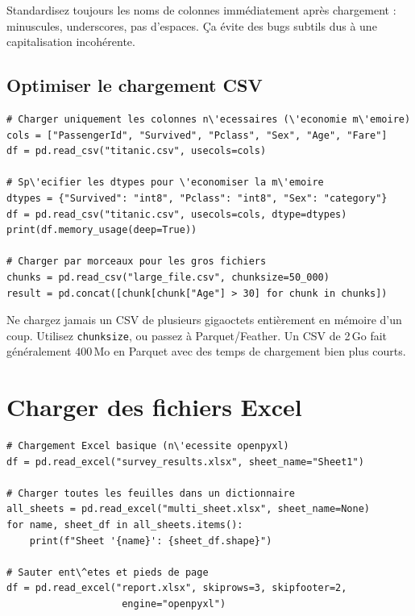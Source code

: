 \begin{preprocesstip}
Standardisez toujours les noms de colonnes imm\'ediatement apr\`es chargement : minuscules, underscores, pas d'espaces. \c{C}a \'evite des bugs subtils dus \`a une capitalisation incoh\'erente.
\end{preprocesstip}

\subsection{Optimiser le chargement CSV}

\begin{verbatim}
# Charger uniquement les colonnes n\'ecessaires (\'economie m\'emoire)
cols = ["PassengerId", "Survived", "Pclass", "Sex", "Age", "Fare"]
df = pd.read_csv("titanic.csv", usecols=cols)

# Sp\'ecifier les dtypes pour \'economiser la m\'emoire
dtypes = {"Survived": "int8", "Pclass": "int8", "Sex": "category"}
df = pd.read_csv("titanic.csv", usecols=cols, dtype=dtypes)
print(df.memory_usage(deep=True))

# Charger par morceaux pour les gros fichiers
chunks = pd.read_csv("large_file.csv", chunksize=50_000)
result = pd.concat([chunk[chunk["Age"] > 30] for chunk in chunks])
\end{verbatim}

\begin{warningbox}
Ne chargez jamais un CSV de plusieurs gigaoctets enti\`erement en m\'emoire d'un coup. Utilisez \texttt{chunksize}, ou passez \`a Parquet/Feather. Un CSV de 2\,Go fait g\'en\'eralement 400\,Mo en Parquet avec des temps de chargement bien plus courts.
\end{warningbox}

\section{Charger des fichiers Excel}

\begin{verbatim}
# Chargement Excel basique (n\'ecessite openpyxl)
df = pd.read_excel("survey_results.xlsx", sheet_name="Sheet1")

# Charger toutes les feuilles dans un dictionnaire
all_sheets = pd.read_excel("multi_sheet.xlsx", sheet_name=None)
for name, sheet_df in all_sheets.items():
    print(f"Sheet '{name}': {sheet_df.shape}")

# Sauter ent\^etes et pieds de page
df = pd.read_excel("report.xlsx", skiprows=3, skipfooter=2,
                    engine="openpyxl")
\end{verbatim}

